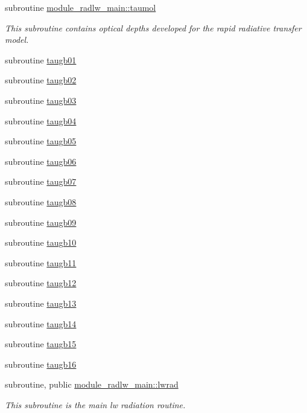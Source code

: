 \begin{DoxyCompactItemize}
subroutine \hyperlink{namespacemodule__radlw__main_a7025e0f49149cf0ddbdd175efb5fe986}{module\+\_\+radlw\+\_\+main\+::taumol}                                                                                               
\begin{DoxyCompactList}\small\item\em This subroutine contains optical depths developed for the rapid radiative transfer model. \end{DoxyCompactList}\item 
subroutine \hyperlink{radlw__main_8f_a001d1bcd17533f7f920f859ff9a4e60f}{taugb01}
\item 
subroutine \hyperlink{radlw__main_8f_a926415cb51870dda9a90883e01a2ee38}{taugb02}
\item 
subroutine \hyperlink{radlw__main_8f_a45e39b507d1fc031c80d9c7f06905d4a}{taugb03}
\item 
subroutine \hyperlink{radlw__main_8f_ae69174bcf1a87dc7a5baffac69797d07}{taugb04}
\item 
subroutine \hyperlink{radlw__main_8f_a92653ffcd20ff247a00eaf3339cba6df}{taugb05}
\item 
subroutine \hyperlink{radlw__main_8f_a7190d415614aa35deefacff1041d4719}{taugb06}
\item 
subroutine \hyperlink{radlw__main_8f_a2208d86ae0712a0ca426bbe96de825bc}{taugb07}
\item 
subroutine \hyperlink{radlw__main_8f_a1447d5bda5b521d27171e61881684183}{taugb08}
\item 
subroutine \hyperlink{radlw__main_8f_a889abbaaa2d421c0c3dc820e2004414d}{taugb09}
\item 
subroutine \hyperlink{radlw__main_8f_a74c1cb8390daff1e5ce5e863c50b7873}{taugb10}
\item 
subroutine \hyperlink{radlw__main_8f_a573fd5b3580d6bbf5bfa2f01ee547034}{taugb11}
\item 
subroutine \hyperlink{radlw__main_8f_ae56eaa9e3b897ca235d4d6b271cc1e47}{taugb12}
\item 
subroutine \hyperlink{radlw__main_8f_a2ac7254d2dcff516e8e44b8b679302c0}{taugb13}
\item 
subroutine \hyperlink{radlw__main_8f_a26140cbe1a3d6119b56cf5c2d539670e}{taugb14}
\item 
subroutine \hyperlink{radlw__main_8f_a93b5c0ae0525697ffffb6228581a301c}{taugb15}
\item 
subroutine \hyperlink{radlw__main_8f_a942ce0031745cd1b3b4ebc3915970554}{taugb16}
\end{DoxyCompactItemize}
{\bf }\par
\begin{DoxyCompactItemize}
\item 
subroutine, public \hyperlink{namespacemodule__radlw__main_a072a355f2067d729d64d2997270e36b1}{module\+\_\+radlw\+\_\+main\+::lwrad}                                                                                                 
\begin{DoxyCompactList}\small\item\em This subroutine is the main lw radiation routine. \end{DoxyCompactList}\end{DoxyCompactItemize}

